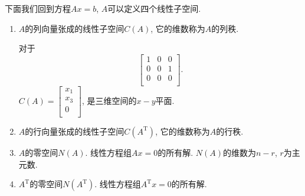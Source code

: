 下面我们回到方程$Ax=b$, $A$可以定义四个线性子空间.
\begin{enumerate}
    \item $A$的列向量张成的线性子空间$C(A)$, 它的维数称为$A$的列秩.
    \begin{example}
        对于 $$
        \begin{bmatrix}
         1 & 0 & 0\\
         0 & 0 & 1\\
         0 & 0 & 0\\
        \end{bmatrix}.
        $$
        $C(A) = \begin{bmatrix}
         x_1\\
         x_3\\
         0\\
        \end{bmatrix}$, 是三维空间的$x-y$平面.
    \end{example}

    \item $A$的行向量张成的线性子空间$C(A^{\mathrm{T}})$, 它的维数称为$A$的行秩.
    
    \item $A$的零空间$N(A)$. 线性方程组$Ax=0$的所有解. $N(A)$的维数为$n-r$, $r$为主元数.
    
    \item $A^{\mathrm{T}}$的零空间$N(A^{\mathrm{T}})$. 线性方程组$A^{\mathrm{T}}x = 0$的所有解.
\end{enumerate}




